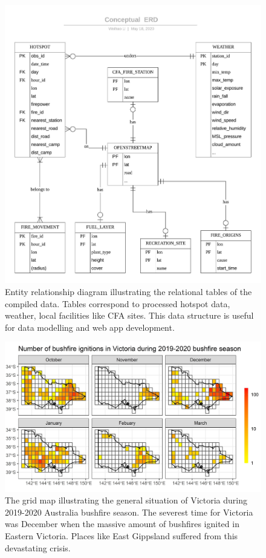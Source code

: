 \documentclass[11pt,a4paper,]{article}
\begin{document}
\begin{figure}
\centering
\includegraphics{figures/Shiny_app_data_Conceptual_ERD.jpeg}
\caption{Entity relationship diagram illustrating the relational tables of the compiled data. Tables correspond to processed hotspot data, weather, local facilities like CFA sites. This data structure is useful for data modelling and web app development. \label{fig:ERD}}
\end{figure}

\begin{figure}
\centering
\includegraphics[width=6.25in,height=\textheight]{figures/number_of_ignitions.jpg}
\caption{The grid map illustrating the general situation of Victoria during 2019-2020 Australia bushfire season. The severest time for Victoria was December when the massive amount of bushfires ignited in Eastern Victoria. Places like East Gippsland suffered from this devastating crisis. \label{fig:overview}}
\end{figure}

\clearpage

\printbibliography
\end{document}
